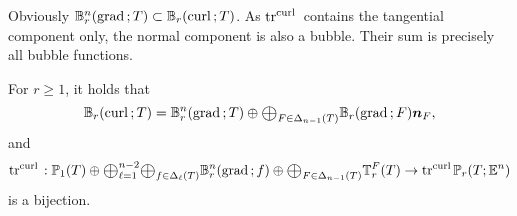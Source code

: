 \documentclass[10pt]{amsart}
\newcommand{\Oplus}{\ensuremath{\vcenter{\hbox{\scalebox{1.5}{$\oplus$}}}}}
\begin{document}
Obviously $\mathbb B_r^n({\rm grad\,}; T)\subset \mathbb B_r({\rm curl\,}; T)$. As $\operatorname{tr}^{{\rm curl\,}}$ contains the tangential component only, the normal component is also a bubble. Their sum is precisely all bubble functions.  
\begin{theorem}\label{thm:curlbubbletracespacedecomp}
For $r\geq 1$, it holds that
\begin{equation}\label{eq:curlbubbledecomp}
\mathbb B_r(\curl; T) =  \mathbb B_r^n(\grad; T) \oplus \Oplus_{F\in \Delta_{n-1}(T)} \mathbb B_r(\grad; F)\bs n_F,
\end{equation}
and
\begin{equation}\label{eq:trNrf}
{\rm tr}^{\curl} : \mathbb P_1(T)\oplus \Oplus_{\ell = 1}^{n-2}\Oplus_{f\in \Delta_{\ell}(T)} \mathbb B_r^n(\grad; f)\oplus \Oplus_{F\in \Delta_{n-1}(T)}  \mathbb{T}^F_r( T) \to  {\rm tr}^{\curl} \mathbb P_r(T; \mathbb E^n)
\end{equation} 
is a bijection.
\end{theorem}
\end{document}
